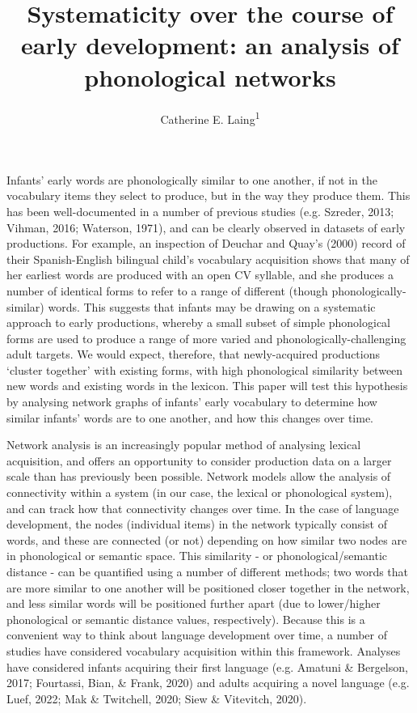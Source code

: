 \documentclass[
  man]{apa6}
\title{Systematicity over the course of early development: an analysis of phonological networks}
\author{Catherine E. Laing\textsuperscript{1}}
\date{}
\affiliation{\vspace{0.5cm}\textsuperscript{1} University of York, York, UK}
\begin{document}
\maketitle

Infants' early words are phonologically similar to one another, if not in the vocabulary items they select to produce, but in the way they produce them. This has been well-documented in a number of previous studies (e.g. Szreder, 2013; Vihman, 2016; Waterson, 1971), and can be clearly observed in datasets of early productions. For example, an inspection of Deuchar and Quay's (2000) record of their Spanish-English bilingual child's vocabulary acquisition shows that many of her earliest words are produced with an open CV syllable, and she produces a number of identical forms to refer to a range of different (though phonologically-similar) words. This suggests that infants may be drawing on a systematic approach to early productions, whereby a small subset of simple phonological forms are used to produce a range of more varied and phonologically-challenging adult targets. We would expect, therefore, that newly-acquired productions `cluster together' with existing forms, with high phonological similarity between new words and existing words in the lexicon. This paper will test this hypothesis by analysing network graphs of infants' early vocabulary to determine how similar infants' words are to one another, and how this changes over time.

Network analysis is an increasingly popular method of analysing lexical acquisition, and offers an opportunity to consider production data on a larger scale than has previously been possible. Network models allow the analysis of connectivity within a system (in our case, the lexical or phonological system), and can track how that connectivity changes over time. In the case of language development, the nodes (individual items) in the network typically consist of words, and these are connected (or not) depending on how similar two nodes are in phonological or semantic space. This similarity - or phonological/semantic distance - can be quantified using a number of different methods; two words that are more similar to one another will be positioned closer together in the network, and less similar words will be positioned further apart (due to lower/higher phonological or semantic distance values, respectively). Because this is a convenient way to think about language development over time, a number of studies have considered vocabulary acquisition within this framework. Analyses have considered infants acquiring their first language (e.g. Amatuni \& Bergelson, 2017; Fourtassi, Bian, \& Frank, 2020) and adults acquiring a novel language (e.g. Luef, 2022; Mak \& Twitchell, 2020; Siew \& Vitevitch, 2020).
\end{document}
